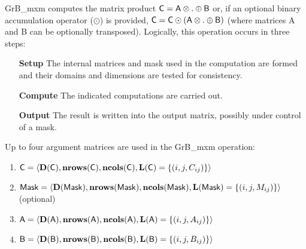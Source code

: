 {\sf GrB\_mxm} computes the matrix product ${\sf C} = {\sf
A} \otimes . \oplus {\sf B}$ or, if an optional binary accumulation
operator ($\odot$) is provided, ${\sf C} = {\sf C} \odot
\left({\sf A} \otimes . \oplus {\sf B}\right)$ (where matrices {\sf A}
and {\sf B} can be optionally transposed).  Logically, this operation
occurs in three steps:
\begin{enumerate}
\item[\bf Setup] The internal matrices and mask used in the computation are formed and their 
domains and dimensions are tested for consistency.
\item[\bf Compute] The indicated computations are carried out.
\item[\bf Output] The result is written into the output matrix, possibly under control of a mask.
\end{enumerate}

Up to four argument matrices are used in the {\sf GrB\_mxm} operation:
\begin{enumerate}
	\item ${\sf C} = \langle \bold{D}({\sf C}),\bold{nrows}({\sf C}),\bold{ncols}({\sf C}),\bold{L}({\sf C}) = \{(i,j,C_{ij}) \} \rangle$
	\item ${\sf Mask} = \langle \bold{D}({\sf Mask}),\bold{nrows}({\sf Mask}),\bold{ncols}({\sf Mask}),\bold{L}({\sf Mask}) = \{(i,j,M_{ij}) \} \rangle$ (optional)
	\item ${\sf A} = \langle \bold{D}({\sf A}),\bold{nrows}({\sf A}), \bold{ncols}({\sf A}),\bold{L}({\sf A}) = \{(i,j,A_{ij}) \} \rangle$
	\item ${\sf B} = \langle \bold{D}({\sf B}),\bold{nrows}({\sf B}), \bold{ncols}({\sf B}),\bold{L}({\sf B}) = \{(i,j,B_{ij}) \} \rangle$
\end{enumerate}

